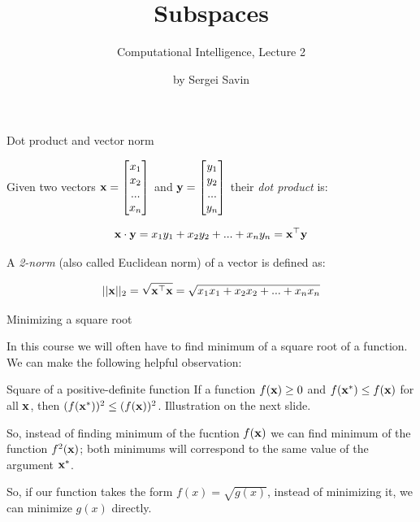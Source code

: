 \documentclass{beamer}
\title{Subspaces}
\subtitle{Computational Intelligence, Lecture 2}
\author{by Sergei Savin}
\date{\mydate}
\begin{document}
\maketitle




\begin{frame}{Dot product and vector norm}
	\begin{flushleft}
		
		Given two vectors $\mathbf{x} = \begin{bmatrix}
			x_1 \\ x_2 \\ ... \\ x_n
		\end{bmatrix}$ and $\mathbf{y} = \begin{bmatrix}
		y_1 \\ y_2 \\ ... \\ y_n
		\end{bmatrix}$ their \emph{dot product} is:
		
		\begin{equation}
			\mathbf{x} \cdot \mathbf{y} = x_1 y_1 + x_2 y_2 + ... + x_n y_n = \mathbf{x}^\top \mathbf{y}
		\end{equation}
		
		A \emph{2-norm} (also called Euclidean norm) of a vector is defined as:
		
		\begin{equation}
			||\mathbf{x}||_2 = \sqrt{\mathbf{x}^\top \mathbf{x}} =  \sqrt{x_1 x_1 + x_2 x_2 + ... + x_n x_n}
		\end{equation}
		
		
	\end{flushleft}
\end{frame}



\begin{frame}{Minimizing a square root}
	\begin{flushleft}
		
		In this course we will often have to find minimum of a square root of a function. We can make the following helpful observation:
		
		\begin{block}{Square of a positive-definite function}
			If a function $f(\mathbf{x}) \geq 0$ and $f(\mathbf{x}^*) \leq f(\mathbf{x})$ for all $\mathbf{x}$, then $(f(\mathbf{x}^*) )^2 \leq (f(\mathbf{x}))^2$. Illustration on the next slide.
		\end{block}
		
		So, instead of finding minimum of the fucntion $f(\mathbf{x})$ we can find minimum of the function $f^2(\mathbf{x})$; both minimums will correspond to the same value of the argument $\mathbf{x}^*$.
		
		\bigskip
		
		So, if our function takes the form $f(x) = \sqrt{g(x)}$, instead of minimizing it, we can minimize $g(x)$ directly.
		
	\end{flushleft}
\end{frame}
\end{document}
